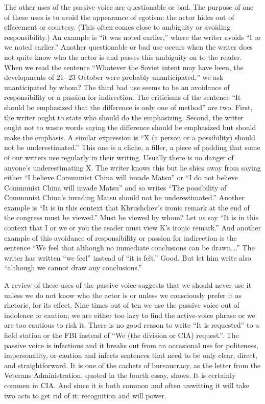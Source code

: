 \documentclass[
    oneside,
    11pt,
]{memoir}
\begin{document}
The other uses of the passive voice are questionable or bad. The purpose of one of these uses is to avoid the appearance of egotism: the actor hides out of effacement or courtesy. (This often comes close to ambiguity or avoiding responsibility.) An example is \enquote{it was noted earlier,} where the writer avoids \enquote{I or we noted earlier.} Another questionable or bad use occurs when the writer does not quite know who the actor is and passes this ambiguity on to the reader. When we read the sentence \enquote{Whatever the Soviet intent may have been, the developments of 21- 23 October were probably unanticipated,} we ask unanticipated by whom? The third bad use seems to be an avoidance of responsibility or a passion for indirection. The criticisms of the sentence \enquote{It should be emphasized that the difference is only one of method} are two. First, the writer ought to state who should do the emphasizing. Second, the writer ought not to waste words saying the difference should be emphasized but should make the emphasis. A similar expression is \enquote{X (a person or a possibility) should not be underestimated.} This one is a cliche, a filler, a piece of padding that some of our writers use regularly in their writing. Usually there is no danger of anyone's underestimating X. The writer knows this but he shies away from saying either \enquote{I believe Communist China will invade Matsu} or \enquote{I do not believe Communist China will invade Matsu} and so writes \enquote{The possibility of Communist China's invading Matsu should not be underestimated.} Another example is \enquote{It is in this context that Khrushchev's ironic remark at the end of the congress must be viewed.} Must be viewed by whom? Let us say \enquote{It is in this context that I or we or you the reader must view K's ironic remark.} And another example of this avoidance of responsibility or passion for indirection is the sentence \enquote{We feel that although no immediate conclusions can be drawn\dots.} The writer has written \enquote{we feel} instead of \enquote{it is felt.} Good. But let him write also \enquote{although we cannot draw any conclusions.} 

A review of these uses of the passive voice suggests that we should never use it unless we do not know who the actor is or unless we consciously prefer it as rhetoric, for its effect. Nine times out of ten we use the passive voice out of indolence or caution; we are either too lazy to find the active-voice phrase or we are too cautious to risk it. There is no good reason to write \enquote{It is requested} to a field station or the FBI instead of \enquote{We (the division or CIA) request.}. The passive voice is infectious and it breaks out from an occasional use for politeness, impersonality, or caution and infects sentences that need to be only clear, direct, and straightforward. It is one of the cachets of bureaucracy, as the letter from the Veterans Administration, quoted in the fourth essay, shows. It is certainly commen in CIA. And since it is both common and often unwitting it will take two acts to get rid of it: recognition and will power. 
\end{document}
